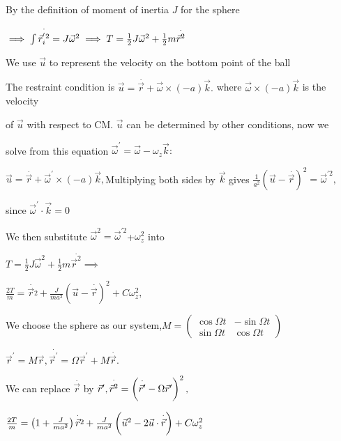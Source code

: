 \documentclass{article}
\begin{document}
By the definition of moment of inertia $J$ for the sphere 

$\implies \int \overset{\cdot }{\vec{r}_{i}^{^{\prime }2}}=J\vec{\omega}%
^{2}\implies T=\frac{1}{2}J\vec{\omega}^{2}+\frac{1}{2}m\overset{\cdot }{%
\vec{r}^{2}}$

We use $\vec{u}$ to represent the velocity on the bottom point of the ball 

The restraint condition is $\vec{u}=\overset{\cdot }{\vec{r}}+\vec{\omega}%
\times \left( -a\right) \vec{k}.$ where $\vec{\omega}\times \left( -a\right) 
\vec{k}$ is the velocity 

of $\vec{u}$ with respect to CM. $\vec{u}$ can be determined by other
conditions, now we 

solve from this equation $\vec{\omega}^{\prime }=\vec{\omega}-\omega _{z}%
\vec{k}:$

$\vec{u}=\overset{\cdot }{\vec{r}}+\vec{\omega}^{\prime }\times \left(
-a\right) \vec{k},$Multiplying both sides by $\vec{k}$ gives $\frac{1}{a^{2}}%
\left( \vec{u}-\overset{\cdot }{\vec{r}}\right) ^{2}=\vec{\omega}^{\prime 2},
$

since $\vec{\omega}^{\prime }\cdot \vec{k}=0$

We then substitute $\vec{\omega}^{2}=\vec{\omega}^{\prime 2}$+$\omega
_{z}^{2}$ into

$T=\frac{1}{2}J\vec{\omega}^{2}+\frac{1}{2}m\overset{\cdot }{\vec{r}^{2}}%
\implies $

$\frac{2T}{m}=\overset{\cdot }{\vec{r}}\overset{2}{}+\frac{J}{ma^{2}}\left( 
\vec{u}-\overset{\cdot }{\vec{r}}\right) ^{2}+C\omega _{z}^{2},$

We choose the sphere as our system,$M=%
\begin{pmatrix}
\cos \Omega t & -\sin \Omega t \\ 
\sin \Omega t & \cos \Omega t%
\end{pmatrix}%
$

$\vec{r}^{\prime }=M\vec{r},\overset{\cdot }{\vec{r}^{\prime }}=\Omega \vec{r%
}^{\prime }+M\overset{\cdot }{\vec{r}}.$

We can replace $\overset{\cdot }{\vec{r}}$ by $\vec{r}^{\prime },\overset{%
\cdot }{\vec{r}^{2}}=\left( \overset{\cdot }{\vec{r}^{\prime }}-\Omega \vec{r%
}^{\prime }\right) ^{2},$

$\frac{2T}{m}=\left( 1+\frac{J}{ma^{2}}\right) \overset{\cdot }{\vec{r}}%
\overset{2}{}+\frac{J}{ma^{2}}\left( \vec{u}^{2}-2\vec{u}\cdot \overset{%
\cdot }{\vec{r}}\right) +C\omega _{z}^{2}$
\end{document}
